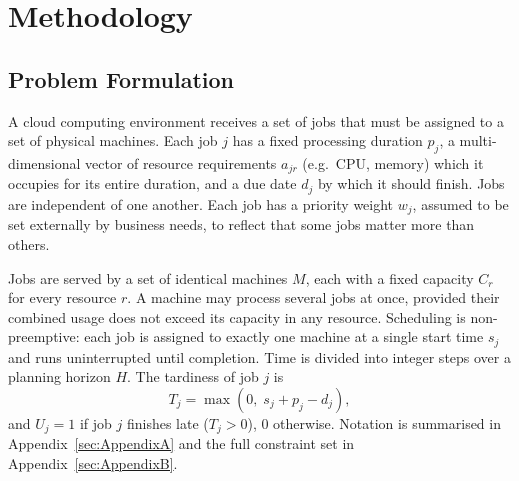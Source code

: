 \documentclass[12pt]{article}
\begin{document}
\section{Methodology}
\subsection{Problem Formulation}\label{sec:problem}
A cloud computing environment receives a set of jobs that must be assigned to a set of physical machines. Each job $j$ has a fixed processing duration $p_j$, a multi-dimensional vector of resource requirements $a_{jr}$ (e.g.\ CPU, memory) which it occupies for its entire duration, and a due date $d_j$ by which it should finish. Jobs are independent of one another. Each job has a priority weight $w_j$, assumed to be set externally by business needs, to reflect that some jobs matter more than others.

Jobs are served by a set of identical machines $M$, each with a fixed capacity $C_r$ for every resource $r$. A machine may process several jobs at once, provided their combined usage does not exceed its capacity in any resource. Scheduling is non-preemptive: each job is assigned to exactly one machine at a single start time $s_j$ and runs uninterrupted until completion. Time is divided into integer steps over a planning horizon $H$. The tardiness of job $j$ is
\begin{equation}\label{eq:tardiness}
    T_j = \max\left(0,\; s_j + p_j - d_j\right),
\end{equation}
and $U_j = 1$ if job $j$ finishes late ($T_j > 0$), $0$ otherwise. Notation is summarised in Appendix~\ref{sec:AppendixA} and the full constraint set in Appendix~\ref{sec:AppendixB}.
\end{document}
